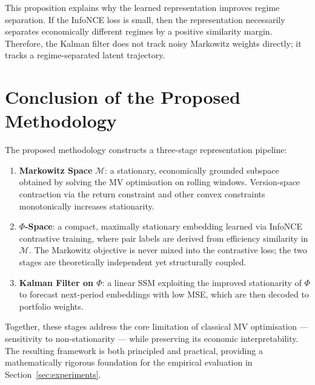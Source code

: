 \documentclass[preprint,12pt]{elsarticle}
\theoremstyle{plain}
\theoremstyle{definition}
\newcommand{\calM}{\mathcal{M}}
\begin{document}
This proposition explains why the learned representation improves regime separation. If the InfoNCE loss is small, then the representation necessarily separates economically different regimes by a positive similarity margin. Therefore, the Kalman filter does not track noisy Markowitz weights directly; it tracks a regime-separated latent trajectory.

\section{Conclusion of the Proposed Methodology}
\label{sec:conclusion}

The proposed methodology constructs a three-stage representation pipeline:

\begin{enumerate}
  \item \textbf{Markowitz Space} $\calM$: a stationary, economically grounded
        subspace obtained by solving the MV optimisation on rolling windows.
        Version-space contraction via the return constraint and other convex
        constraints monotonically increases stationarity.

  \item \textbf{$\Phi$-Space}: a compact, maximally stationary embedding learned
        via InfoNCE contrastive training, where pair labels are derived from
        efficiency similarity in $\calM$.  The Markowitz objective is never
        mixed into the contrastive loss; the two stages are theoretically
        independent yet structurally coupled.

  \item \textbf{Kalman Filter on $\Phi$}: a linear SSM exploiting the improved
        stationarity of $\Phi$ to forecast next-period embeddings with low MSE,
        which are then decoded to portfolio weights.
\end{enumerate}

Together, these stages address the core limitation of classical MV
optimisation — sensitivity to non-stationarity — while preserving its economic
interpretability.  The resulting framework is both principled and practical,
providing a mathematically rigorous foundation for the empirical evaluation in
Section~\ref{sec:experiments}.
\end{document}
